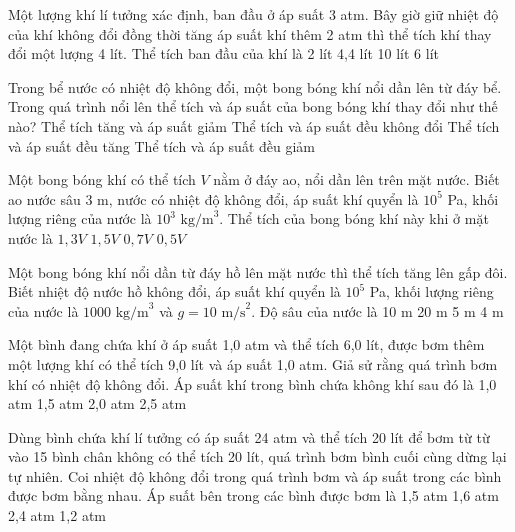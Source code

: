 \documentclass[12pt,a4paper]{article}
\begin{document}
\begin{ex}
	Một lượng khí lí tưởng xác định, ban đầu ở áp suất 3 atm. Bây giờ giữ nhiệt độ của khí không đổi đồng thời tăng áp suất khí thêm 2 atm thì thể tích khí thay đổi một lượng 4 lít. Thể tích ban đầu của khí là
	\choice
	{2 lít}
	{4,4 lít}
	{10 lít}
	{6 lít}
\end{ex}

\begin{ex}
	Trong bể nước có nhiệt độ không đổi, một bong bóng khí nổi dần lên từ đáy bể. Trong quá trình nổi lên thể tích và áp suất của bong bóng khí thay đổi như thế nào?
	\choice
	{Thể tích tăng và áp suất giảm}
	{Thể tích và áp suất đều không đổi}
	{Thể tích và áp suất đều tăng}
	{Thể tích và áp suất đều giảm}
\end{ex}

\begin{ex}
	Một bong bóng khí có thể tích $V$ nằm ở đáy ao, nổi dần lên trên mặt nước. Biết ao nước sâu 3 m, nước có nhiệt độ không đổi, áp suất khí quyển là $10^5$ Pa, khối lượng riêng của nước là $10^3 \text{ kg/m}^3$. Thể tích của bong bóng khí này khi ở mặt nước là
	\choice
	{$1,3V$}
	{$1,5V$}
	{$0,7V$}
	{$0,5V$}
\end{ex}

\begin{ex}
	Một bong bóng khí nổi dần từ đáy hồ lên mặt nước thì thể tích tăng lên gấp đôi. Biết nhiệt độ nước hồ không đổi, áp suất khí quyển là $10^5$ Pa, khối lượng riêng của nước là $1000 \text{ kg/m}^3$ và $g = 10 \text{ m/s}^2$. Độ sâu của nước là
	\choice
	{10 m}
	{20 m}
	{5 m}
	{4 m}
\end{ex}

\begin{ex}
	Một bình đang chứa khí ở áp suất 1,0 atm và thể tích 6,0 lít, được bơm thêm một lượng khí có thể tích 9,0 lít và áp suất 1,0 atm. Giả sử rằng quá trình bơm khí có nhiệt độ không đổi. Áp suất khí trong bình chứa không khí sau đó là
	\choice
	{1,0 atm}
	{1,5 atm}
	{2,0 atm}
	{2,5 atm}
\end{ex}

\begin{ex}
	Dùng bình chứa khí lí tưởng có áp suất 24 atm và thể tích 20 lít để bơm từ từ vào 15 bình chân không có thể tích 20 lít, quá trình bơm bình cuối cùng dừng lại tự nhiên. Coi nhiệt độ không đổi trong quá trình bơm và áp suất trong các bình được bơm bằng nhau. Áp suất bên trong các bình được bơm là
	\choice
	{1,5 atm}
	{1,6 atm}
	{2,4 atm}
	{1,2 atm}
\end{ex}
\end{document}
